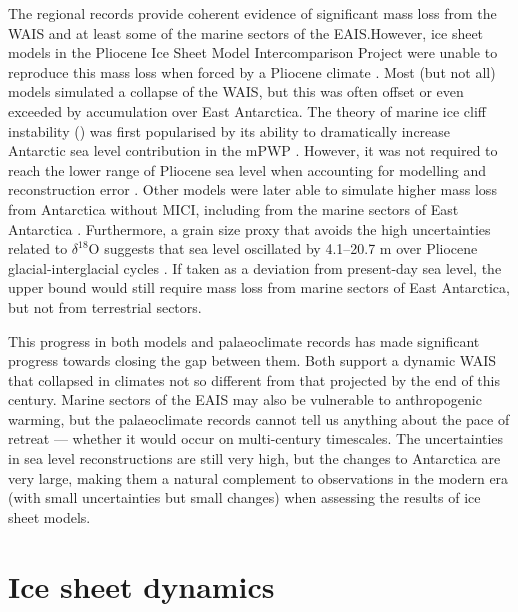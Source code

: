 The regional records provide coherent evidence of significant mass loss from the WAIS and at least some of the marine sectors of the EAIS.\@ However, ice sheet models in the Pliocene Ice Sheet Model Intercomparison Project \citep{dolanPlioceneIceSheet2012} were unable to reproduce this mass loss when forced by a Pliocene climate \citep{deboerSimulatingAntarcticIce2015,dolanHighClimateModel2018}. Most (but not all) models simulated a collapse of the WAIS, but this was often offset or even exceeded by accumulation over East Antarctica. The theory of marine ice cliff instability () was first popularised by its ability to dramatically increase Antarctic sea level contribution in the mPWP \citep{pollardPotentialAntarcticIce2015}. However, it was not required to reach the lower range of Pliocene sea level when accounting for modelling and reconstruction error \citep{edwardsRevisitingAntarcticIce2019}. Other models were later able to simulate higher mass loss from Antarctica without MICI, including from the marine sectors of East Antarctica \citep{golledgeAntarcticClimateIcesheet2017,blascoAntarcticTippingPoints2024}. Furthermore, a grain size proxy that avoids the high uncertainties related to $\delta^{18}$O suggests that sea level oscillated by 4.1--20.7 m over Pliocene glacial-interglacial cycles \citep{grantAmplitudeOriginSealevel2019,grantPlioceneSeaLevel2021}. If taken as a deviation from present-day sea level, the upper bound would still require mass loss from marine sectors of East Antarctica, but not from terrestrial sectors.

This progress in both models and palaeoclimate records has made significant progress towards closing the gap between them. Both support a dynamic WAIS that collapsed in climates not so different from that projected by the end of this century. Marine sectors of the EAIS may also be vulnerable to anthropogenic warming, but the palaeoclimate records cannot tell us anything about the pace of retreat --- whether it would occur on multi-century timescales. The uncertainties in sea level reconstructions are still very high, but the changes to Antarctica are very large, making them a natural complement to observations in the modern era (with small uncertainties but small changes) when assessing the results of ice sheet models.

\section{Ice sheet dynamics}

